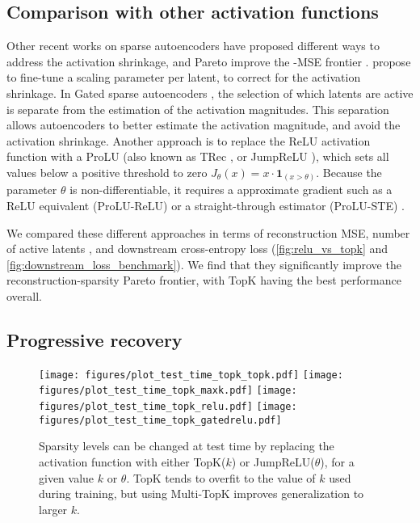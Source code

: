 \subsection{Comparison with other activation functions}
\label{sec:benchmark}

Other recent works on sparse autoencoders have proposed different ways to address the \Lone activation shrinkage, and Pareto improve the \Lzero-MSE frontier \citep{wright2024addressing, taggart2024prolu,rajamanoharan2024improving}.  
\citet{wright2024addressing} propose to fine-tune a scaling parameter per latent, to correct for the \Lone activation shrinkage.
In Gated sparse autoencoders  \citep{rajamanoharan2024improving}, the selection of which latents are active is separate from the estimation of the activation magnitudes. This separation allows autoencoders to better estimate the activation magnitude, and avoid the \Lone activation shrinkage.
Another approach is to replace the ReLU activation function with a ProLU \citep{taggart2024prolu} (also known as TRec \citep{konda2014zero}, or JumpReLU \citep{erichson2019jumprelu}), which sets all values below a positive threshold to zero $J_{\theta}(x) = x \cdot \mathbf{1}_{(x > \theta)}$. Because the  parameter $\theta$ is non-differentiable, it requires a approximate gradient such as a ReLU equivalent (ProLU-ReLU) or a straight-through estimator (ProLU-STE) \citep{taggart2024prolu}.

We compared these different approaches in terms of reconstruction MSE, number of active latents \Lzero, and downstream cross-entropy loss (\autoref{fig:relu_vs_topk} and \ref{fig:downstream_loss_benchmark}). We find that they significantly improve the reconstruction-sparsity Pareto frontier, with TopK having the best performance overall.



\subsection{Progressive recovery}
\label{sec:testtimek}


\begin{figure}[ht]
    \centering
    \texttt{[image: figures/plot\_test\_time\_topk\_topk.pdf]}
    \texttt{[image: figures/plot\_test\_time\_topk\_maxk.pdf]}
    \texttt{[image: figures/plot\_test\_time\_topk\_relu.pdf]}
    \texttt{[image: figures/plot\_test\_time\_topk\_gatedrelu.pdf]}
    \caption{Sparsity levels can be changed at test time by replacing the activation function with either TopK($k$) or JumpReLU($\theta$), for a given value $k$ or $\theta$. TopK tends to overfit to the value of $k$ used during training, but using Multi-TopK improves generalization to larger $k$.}
    \label{fig:test_time_k}
\end{figure}




